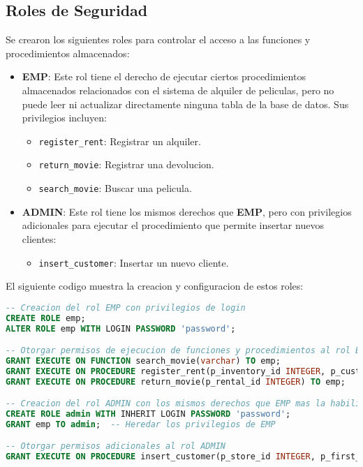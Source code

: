 \documentclass{article}
\begin{document}
\subsection{Roles de Seguridad}

Se crearon los siguientes roles para controlar el acceso a las funciones y procedimientos almacenados:

\begin{itemize}
    \item \textbf{EMP}: Este rol tiene el derecho de ejecutar ciertos procedimientos almacenados relacionados con el sistema de alquiler de peliculas, pero no puede leer ni actualizar directamente ninguna tabla de la base de datos. Sus privilegios incluyen:
    \begin{itemize}
        \item \texttt{register\_rent}: Registrar un alquiler.
        \item \texttt{return\_movie}: Registrar una devolucion.
        \item \texttt{search\_movie}: Buscar una pelicula.
    \end{itemize}

    \item \textbf{ADMIN}: Este rol tiene los mismos derechos que \textbf{EMP}, pero con privilegios adicionales para ejecutar el procedimiento que permite insertar nuevos clientes:
    \begin{itemize}
        \item \texttt{insert\_customer}: Insertar un nuevo cliente.
    \end{itemize}
\end{itemize}

El siguiente codigo muestra la creacion y configuracion de estos roles:

\begin{lstlisting}[language=SQL]
-- Creacion del rol EMP con privilegios de login
CREATE ROLE emp;
ALTER ROLE emp WITH LOGIN PASSWORD 'password';

-- Otorgar permisos de ejecucion de funciones y procedimientos al rol EMP
GRANT EXECUTE ON FUNCTION search_movie(varchar) TO emp;
GRANT EXECUTE ON PROCEDURE register_rent(p_inventory_id INTEGER, p_customer_id INTEGER, p_staff_id INTEGER) TO emp;
GRANT EXECUTE ON PROCEDURE return_movie(p_rental_id INTEGER) TO emp;

-- Creacion del rol ADMIN con los mismos derechos que EMP mas la habilidad de insertar clientes
CREATE ROLE admin WITH INHERIT LOGIN PASSWORD 'password';
GRANT emp TO admin;  -- Heredar los privilegios de EMP

-- Otorgar permisos adicionales al rol ADMIN
GRANT EXECUTE ON PROCEDURE insert_customer(p_store_id INTEGER, p_first_name VARCHAR, p_last_name VARCHAR, p_email VARCHAR, p_address_id INTEGER, p_active_bool BOOLEAN) TO admin;
\end{lstlisting}
\end{document}
